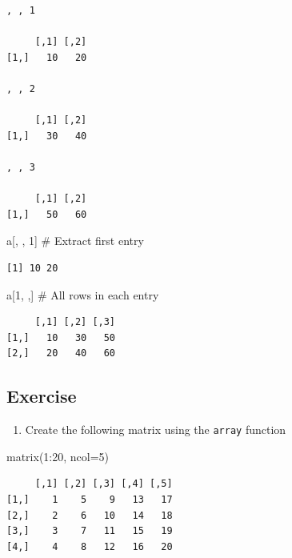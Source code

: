 \documentclass[
  letterpaper,
  DIV=11,
  numbers=noendperiod]{scrreprt}
\newenvironment{Shaded}{\begin{snugshade}}{\end{snugshade}}
\newcommand{\AttributeTok}[1]{\textcolor[rgb]{0.40,0.45,0.13}{#1}}
\newcommand{\CommentTok}[1]{\textcolor[rgb]{0.37,0.37,0.37}{#1}}
\newcommand{\DecValTok}[1]{\textcolor[rgb]{0.68,0.00,0.00}{#1}}
\newcommand{\FunctionTok}[1]{\textcolor[rgb]{0.28,0.35,0.67}{#1}}
\newcommand{\NormalTok}[1]{\textcolor[rgb]{0.00,0.23,0.31}{#1}}
\newcommand{\SpecialCharTok}[1]{\textcolor[rgb]{0.37,0.37,0.37}{#1}}
\providecommand{\tightlist}{%
  \setlength{\itemsep}{0pt}\setlength{\parskip}{0pt}}\usepackage{longtable,booktabs,array}
\begin{document}
\begin{verbatim}
, , 1

     [,1] [,2]
[1,]   10   20

, , 2

     [,1] [,2]
[1,]   30   40

, , 3

     [,1] [,2]
[1,]   50   60
\end{verbatim}

\begin{Shaded}
\begin{Highlighting}[]
\NormalTok{a[, , }\DecValTok{1}\NormalTok{] }\CommentTok{\# Extract first entry}
\end{Highlighting}
\end{Shaded}

\begin{verbatim}
[1] 10 20
\end{verbatim}

\begin{Shaded}
\begin{Highlighting}[]
\NormalTok{a[}\DecValTok{1}\NormalTok{, ,] }\CommentTok{\# All rows in each entry}
\end{Highlighting}
\end{Shaded}

\begin{verbatim}
     [,1] [,2] [,3]
[1,]   10   30   50
[2,]   20   40   60
\end{verbatim}

\subsection{Exercise}\label{exercise-3}

\begin{enumerate}
\def\labelenumi{\arabic{enumi}.}
\tightlist
\item
  Create the following matrix using the \texttt{array} function
\end{enumerate}

\begin{Shaded}
\begin{Highlighting}[]
\FunctionTok{matrix}\NormalTok{(}\DecValTok{1}\SpecialCharTok{:}\DecValTok{20}\NormalTok{, }\AttributeTok{ncol=}\DecValTok{5}\NormalTok{)}
\end{Highlighting}
\end{Shaded}

\begin{verbatim}
     [,1] [,2] [,3] [,4] [,5]
[1,]    1    5    9   13   17
[2,]    2    6   10   14   18
[3,]    3    7   11   15   19
[4,]    4    8   12   16   20
\end{verbatim}
\end{document}
